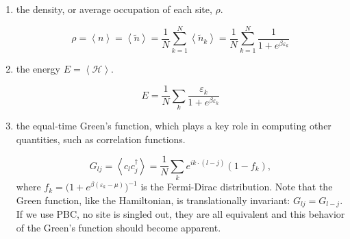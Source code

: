 \begin{enumerate}
\item the density, or average occupation of each site, $\rho$.

\begin{equation}
\rho = \left\langle n \right\rangle = \left\langle \tilde{n} \right\rangle = \frac{1}{N} \sum_{k=1}^N \left\langle \tilde{n}_k \right\rangle  = \frac{1}{N} \sum_{k=1}^N  \frac{1}{1 + e^{\beta\varepsilon_k}}
\end{equation}

\item the energy $E = \left\langle \mathcal{H} \right\rangle$.

\begin{equation}
E = \frac{1}{N} \sum_k \frac{\varepsilon_k}{1 + e^{\beta\varepsilon_k}}
\end{equation}

\item the equal-time Green's function, which plays a key role in computing other quantities, such as correlation functions.

\begin{equation}
G_{lj} = \left\langle c_l c_j^\dagger \right\rangle = \frac{1}{N} \sum_k e^{ i k \cdot ( l - j ) } ( 1 - f_k ),
\end{equation}
where $f_k = \big(1 + e^{\beta(\varepsilon_k - \mu)} \big)^{-1}$ is the Fermi-Dirac distribution. Note that the Green function, like the Hamiltonian, is translationally invariant: $G_{lj} = G_{l-j}$. If we use PBC, no site is singled out, they are all equivalent and this behavior of the Green's function should become apparent.
\end{enumerate}